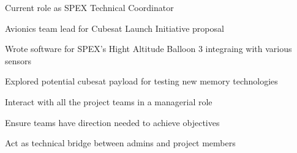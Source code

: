 \documentclass[]{deedy-resume-openfont}
\begin{document}
\hfill{}
\begin{tightemize}
	\item Current role as SPEX Technical Coordinator
	\item Avionics team lead for Cubesat Launch Initiative proposal
	\item Wrote software for SPEX's Hight Altitude Balloon 3 integraing with various sensors
	\item Explored potential cubesat payload for testing new memory technologies
\end{tightemize}
\hfill{}
\begin{tightemize}
	\item Interact with all the project teams in a managerial role
	\item Ensure teams have direction needed to achieve objectives
	\item Act as technical bridge between admins and project members
\end{tightemize}
	
\sectionsep
%
%
\end{document}
